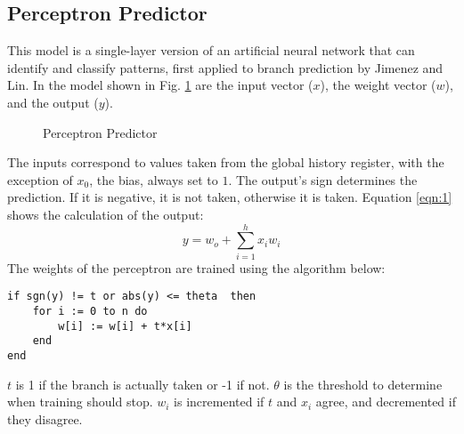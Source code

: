 \documentclass[conference]{IEEEtran}
\begin{document}
\subsection{Perceptron Predictor}
This model is a single-layer version of an artificial neural network that can identify and classify patterns, first applied to branch prediction by Jimenez and Lin\cite{jimenez2001}. In the model shown in Fig. \ref{fig:perceptron} are the input vector ($x$), the weight vector ($w$), and the output ($y$).
\begin{figure}
    \centering
    \caption{Perceptron Predictor}
	\label{fig:perceptron}
\end{figure}
The inputs correspond to values taken from the global history register, with the exception of $x_0$, the bias, always set to $1$. The output's sign determines the prediction. If it is negative, it is not taken, otherwise it is taken. Equation \eqref{eqn:1} shows the calculation of the output:
\begin{equation}
    y = w_o + \sum_{i=1}^{h}{x_iw_i}
    \label{eqn:1}
\end{equation}
The weights of the perceptron are trained using the algorithm below:
\begin{lstlisting}
if sgn(y) != t or abs(y) <= theta  then
    for i := 0 to n do
        w[i] := w[i] + t*x[i]
    end
end
\end{lstlisting}
$t$ is 1 if the branch is actually taken or -1 if not. $\theta$ is the threshold to determine when training should stop. $w_i$ is incremented if $t$ and $x_i$ agree, and decremented if they disagree.




\vspace{12pt}
\end{document}
